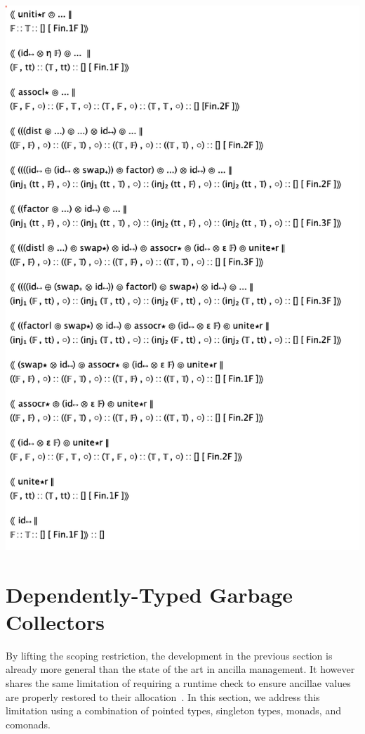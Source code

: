 \documentclass[sigplan,10pt,review,anonymous]{acmart}
\begin{document}
\includegraphics[scale=0.5]{trace2.png}


\section{Dependently-Typed Garbage Collectors}
\label{sec:dep}

By lifting the scoping restriction, the development in the previous
section is already more general than the state of the art in ancilla
management.  It however shares the same limitation of requiring a
runtime check to ensure ancillae values are properly restored to their
allocation~\cite{10.1007/978-3-319-20860-2_13,Green:2013:QSQ:2491956.2462177}.
In this section, we address this limitation using a combination of
pointed types, singleton types, monads, and comonads.
\end{document}
